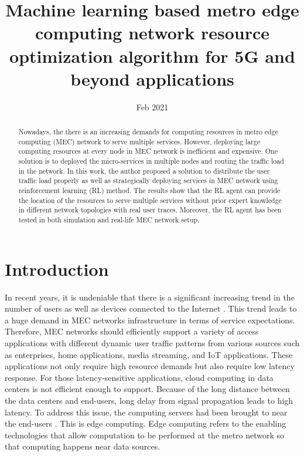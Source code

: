 \documentclass[conference]{IEEEtran}
\title{Machine learning based metro edge computing network resource optimization algorithm for 5G and beyond applications}
\author{\IEEEauthorblockN{Luong Quoc Dat}
\IEEEauthorblockA{\textit{Dept. of Electrical Engineering} \\
\textit{Technical University of Eindhoven}\\
}}
\date{Feb 2021}
\begin{document}
\maketitle

\begin{abstract}
Nowadays, the there is an increasing demands for computing resources in metro edge computing (MEC) network to serve multiple services. However, deploying large computing resources at every node in MEC network is inefficient and expensive. One solution is to deployed the micro-services in multiple nodes and routing the traffic load in the network. In this work, the author proposed a solution to distribute the user traffic load properly as well as strategically deploying services in MEC network using reinforcement learning (RL) method. The results show that the RL agent can provide the location of the resources to serve multiple services without prior expert knowledge in different network topologies with real user traces. Moreover, the RL agent has been tested in both simulation and real-life MEC network setup. 
\end{abstract}

\section{Introduction}
\label{sec:Introduction}
In recent years, it is undeniable that there is a significant increasing trend in the number of users as well as devices connected to the Internet \cite{International2017}. This trend leads to a huge demand in MEC networks infrastructure in terms of service expectations. Therefore, MEC networks should efficiently support a variety of access applications with different dynamic user traffic patterns from various sources such as enterprises, home applications, media streaming, and IoT applications. These applications not only require high resource demands but also require low latency response. For those latency-sensitive applications, cloud computing in data centers is not efficient enough to support. Because of the long distance between the data centers and end-users, long delay from signal propagation leads to high latency. To address this issue, the computing servers had been brought to near the end-users \cite{Shi2016}. This is edge computing. Edge computing refers to the enabling technologies that allow computation to be performed at the metro network so that computing happens near data sources. 
\end{document}
